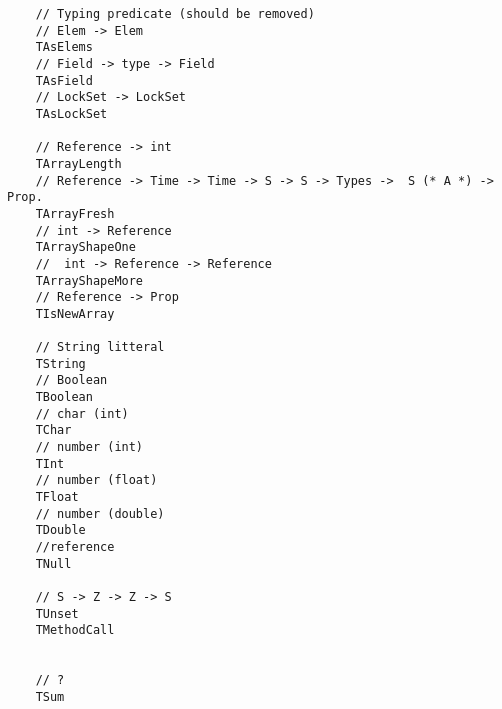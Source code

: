 \documentclass[a4paper]{article}
\begin{document}
\begin{verbatim}
    // Typing predicate (should be removed)
    // Elem -> Elem
    TAsElems
    // Field -> type -> Field
    TAsField 
    // LockSet -> LockSet
    TAsLockSet

    // Reference -> int
    TArrayLength
    // Reference -> Time -> Time -> S -> S -> Types ->  S (* A *) -> Prop.
    TArrayFresh 
    // int -> Reference
    TArrayShapeOne
    //  int -> Reference -> Reference
    TArrayShapeMore
    // Reference -> Prop
    TIsNewArray

    // String litteral
    TString 
    // Boolean
    TBoolean
    // char (int)
    TChar
    // number (int)
    TInt
    // number (float)
    TFloat
    // number (double)
    TDouble 
    //reference
    TNull 

    // S -> Z -> Z -> S
    TUnset
    TMethodCall


    // ?
    TSum
\end{verbatim}
\end{document}
